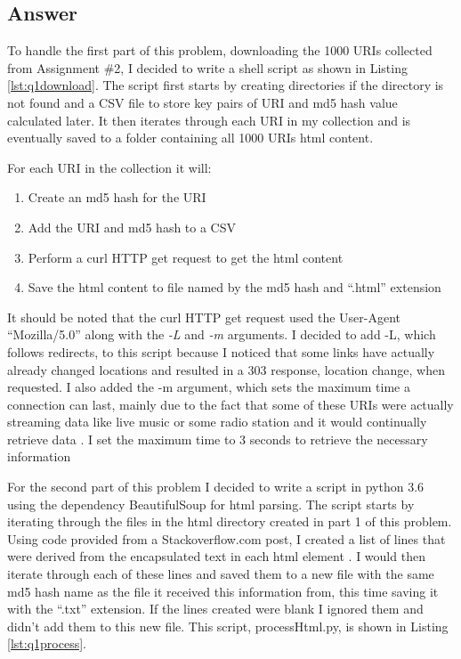 \documentclass[letterpaper,11pt]{article}
\newcommand*{\srcPath}{../src}%
\begin{document}
\subsection*{Answer}

To handle the first part of this problem, downloading the 1000 URIs collected from Assignment \#2, I decided to write a shell script as shown in Listing \ref{lst:q1download}. The script first starts by creating directories if the directory is not found and a CSV file to store key pairs of URI and md5 hash value calculated later. It then iterates through each URI in my collection and is eventually saved to a folder containing all 1000 URIs html content. 

For each URI in the collection it will: 
\begin{enumerate}
    \item Create an md5 hash for the URI
    \item Add the URI and md5 hash to a CSV
    \item Perform a curl HTTP get request to get the html content
    \item Save the html content to file named by the md5 hash and ``.html'' extension
\end{enumerate}

It should be noted that the curl HTTP get request used the User-Agent ``Mozilla/5.0'' along with the \emph{-L} and \emph{-m} arguments. I decided to add -L, which follows redirects, to this script because I noticed that some links have actually already changed locations and resulted in a 303 response, location change, when requested. I also added the -m argument, which sets the maximum time a connection can last, mainly due to the fact that some of these URIs were actually streaming data like live music or some radio station and it would continually retrieve data \cite{curlref}. I set the maximum time to 3 seconds to retrieve the necessary information



For the second part of this problem I decided to write a script in python 3.6 using the dependency BeautifulSoup for html parsing. The script starts by iterating through the files in the html directory created in part 1 of this problem. Using code provided from a Stackoverflow.com post, I created a list of lines that were derived from the encapsulated text in each html element \cite{}. I would then iterate through each of these lines and saved them to a new file with the same md5 hash name as the file it received this information from, this time saving it with the ``.txt'' extension. If the lines created were blank I ignored them and didn't add them to this new file. This script, processHtml.py, is shown in Listing \ref{lst:q1process}.
\end{document}
